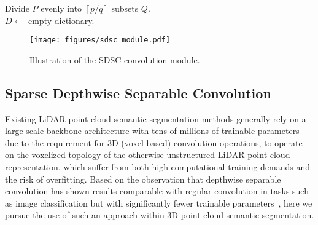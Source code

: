 \documentclass[10pt,twocolumn,letterpaper]{article}
\begin{document}
\begin{algorithm}[htp]
    \footnotesize
    \DontPrintSemicolon
    \SetAlgoLined
    \SetNoFillComment
    \caption{{\samplfull}.}
    \label{alg:MRFD}
    \SetAlgoVlined
    Divide $P$ evenly into $\left\lceil p/q \right\rceil$ subsets $Q$. \\
    $D \gets$ empty dictionary. \\
\end{algorithm}

\begin{figure}[thp]
    \hspace{-0.48cm}
    \centering
    \texttt{[image: figures/sdsc\_module.pdf]}
    \caption{Illustration of the SDSC convolution module.}
    \label{fig:sdsc_module}
    \vspace{-0.5cm}
\end{figure}





\subsection{Sparse Depthwise Separable Convolution}
\label{sec:sdsc}


\noindent
Existing LiDAR point cloud semantic segmentation methods generally rely on a large-scale backbone architecture with tens of millions of trainable parameters ~\cite{hu2020randlanet,hou2022pointtovoxel,jaritz2021xmuda,Unal_2022_CVPR,yi2021complete,zhu2021cylindrical} due to the requirement for 3D (voxel-based) convolution operations, to operate on the voxelized topology of the otherwise unstructured LiDAR point cloud representation, which suffer from both high computational training demands and the risk of overfitting. Based on the observation that depthwise separable convolution has shown results comparable with regular convolution in tasks such as image classification but with significantly fewer trainable parameters~\cite{chollet2017xception,howard2017mobilenets,sandler2018mobilenetv2,tan2019efficientnet,masters2021making,howard2019searching}, here we pursue the use of such an approach within 3D point cloud semantic segmentation.
\end{document}
